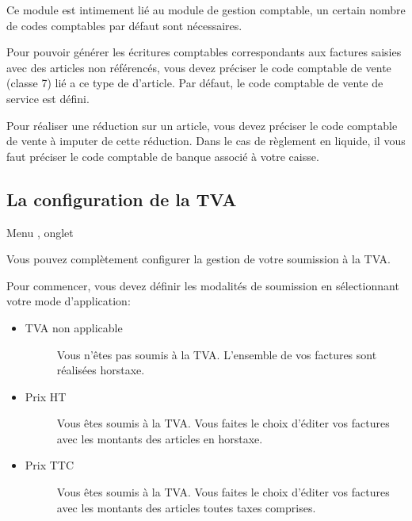 \documentclass[a4paper,10pt,oneside,french]{sphinxmanual}
\begin{document}
Ce module est intimement lié au module de gestion comptable, un certain nombre de codes comptables par défaut sont nécessaires.

Pour pouvoir générer les écritures comptables correspondants aux factures saisies avec des articles non référencés, vous devez préciser le code comptable de vente (classe 7) lié a ce type de d’article. Par défaut, le code comptable de vente de service est défini.

Pour réaliser une réduction sur un article, vous devez préciser le code comptable de vente à imputer de cette réduction.
Dans le cas de règlement en liquide, il vous faut préciser le code comptable de banque associé à votre caisse.


\subsection{La configuration de la TVA}
\label{\detokenize{invoice/configuration:la-configuration-de-la-tva}}
Menu , onglet 

Vous pouvez complètement configurer la gestion de votre soumission à la TVA.

\noindent{}

Pour commencer, vous devez définir les modalités de soumission en sélectionnant votre mode d’application:
\begin{itemize}
\item {} \begin{description}
\item[{TVA non applicable}] \leavevmode
Vous n’êtes pas soumis à la TVA. L’ensemble de vos factures sont réalisées hors\sphinxhyphen{}taxe.

\end{description}

\item {} \begin{description}
\item[{Prix HT}] \leavevmode
Vous êtes soumis à la TVA. Vous faites le choix d’éditer vos factures avec les montants des articles en hors\sphinxhyphen{}taxe.

\end{description}

\item {} \begin{description}
\item[{Prix TTC}] \leavevmode
Vous êtes soumis à la TVA. Vous faites le choix d’éditer vos factures avec les montants des articles toutes taxes comprises.

\end{description}

\end{itemize}
\end{document}
